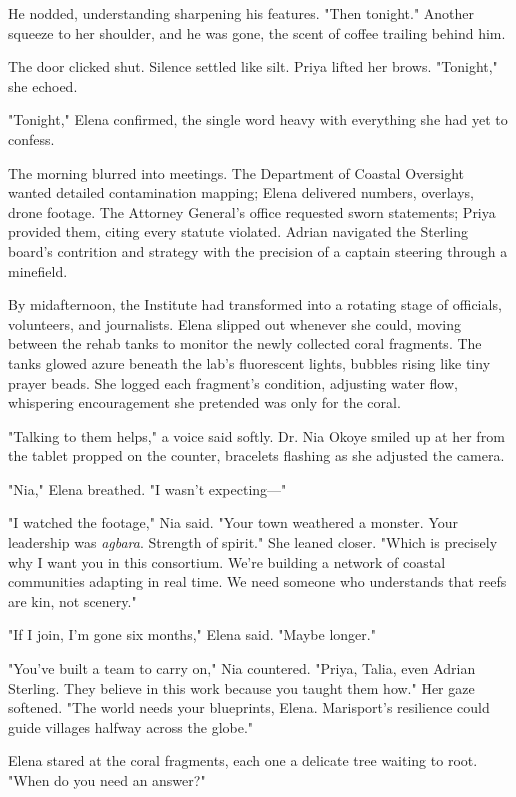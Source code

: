 He nodded, understanding sharpening his features. "Then tonight." Another squeeze to her shoulder, and he was gone, the scent of coffee trailing behind him.

The door clicked shut. Silence settled like silt. Priya lifted her brows. "Tonight," she echoed.

"Tonight," Elena confirmed, the single word heavy with everything she had yet to confess.

\bigskip

The morning blurred into meetings. The Department of Coastal Oversight wanted detailed contamination mapping; Elena delivered numbers, overlays, drone footage. The Attorney General's office requested sworn statements; Priya provided them, citing every statute violated. Adrian navigated the Sterling board's contrition and strategy with the precision of a captain steering through a minefield.

By midafternoon, the Institute had transformed into a rotating stage of officials, volunteers, and journalists. Elena slipped out whenever she could, moving between the rehab tanks to monitor the newly collected coral fragments. The tanks glowed azure beneath the lab's fluorescent lights, bubbles rising like tiny prayer beads. She logged each fragment's condition, adjusting water flow, whispering encouragement she pretended was only for the coral.

"Talking to them helps," a voice said softly. Dr. Nia Okoye smiled up at her from the tablet propped on the counter, bracelets flashing as she adjusted the camera.

"Nia," Elena breathed. "I wasn't expecting—"

"I watched the footage," Nia said. "Your town weathered a monster. Your leadership was \textit{agbara}. Strength of spirit." She leaned closer. "Which is precisely why I want you in this consortium. We're building a network of coastal communities adapting in real time. We need someone who understands that reefs are kin, not scenery."

"If I join, I'm gone six months," Elena said. "Maybe longer."

"You've built a team to carry on," Nia countered. "Priya, Talia, even Adrian Sterling. They believe in this work because you taught them how." Her gaze softened. "The world needs your blueprints, Elena. Marisport's resilience could guide villages halfway across the globe."

Elena stared at the coral fragments, each one a delicate tree waiting to root. "When do you need an answer?"

